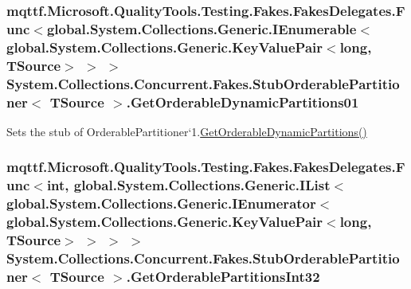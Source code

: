 \hypertarget{class_system_1_1_collections_1_1_concurrent_1_1_fakes_1_1_stub_orderable_partitioner_3_01_t_source_01_4_a6df7ac7b7c1059eb684e179657583160}{
\subsubsection[{Get\-Orderable\-Dynamic\-Partitions01}]{\setlength{\rightskip}{0pt plus 5cm}mqttf.\-Microsoft.\-Quality\-Tools.\-Testing.\-Fakes.\-Fakes\-Delegates.\-Func$<$global.\-System.\-Collections.\-Generic.\-I\-Enumerable$<$global.\-System.\-Collections.\-Generic.\-Key\-Value\-Pair$<$long, T\-Source$>$ $>$ $>$ System.\-Collections.\-Concurrent.\-Fakes.\-Stub\-Orderable\-Partitioner$<$ T\-Source $>$.Get\-Orderable\-Dynamic\-Partitions01}}\label{class_system_1_1_collections_1_1_concurrent_1_1_fakes_1_1_stub_orderable_partitioner_3_01_t_source_01_4_a6df7ac7b7c1059eb684e179657583160}


Sets the stub of Orderable\-Partitioner`1.\hyperlink{class_system_1_1_collections_1_1_concurrent_1_1_fakes_1_1_stub_orderable_partitioner_3_01_t_source_01_4_ad3e506844616c71ccf5baefe68477c1f}{Get\-Orderable\-Dynamic\-Partitions()}

\hypertarget{class_system_1_1_collections_1_1_concurrent_1_1_fakes_1_1_stub_orderable_partitioner_3_01_t_source_01_4_af9c43b369e13c6633fde1b15bff6f798}{
\subsubsection[{Get\-Orderable\-Partitions\-Int32}]{\setlength{\rightskip}{0pt plus 5cm}mqttf.\-Microsoft.\-Quality\-Tools.\-Testing.\-Fakes.\-Fakes\-Delegates.\-Func$<$int, global.\-System.\-Collections.\-Generic.\-I\-List$<$global.\-System.\-Collections.\-Generic.\-I\-Enumerator$<$global.\-System.\-Collections.\-Generic.\-Key\-Value\-Pair$<$long, T\-Source$>$ $>$ $>$ $>$ System.\-Collections.\-Concurrent.\-Fakes.\-Stub\-Orderable\-Partitioner$<$ T\-Source $>$.Get\-Orderable\-Partitions\-Int32}}\label{class_system_1_1_collections_1_1_concurrent_1_1_fakes_1_1_stub_orderable_partitioner_3_01_t_source_01_4_af9c43b369e13c6633fde1b15bff6f798}


